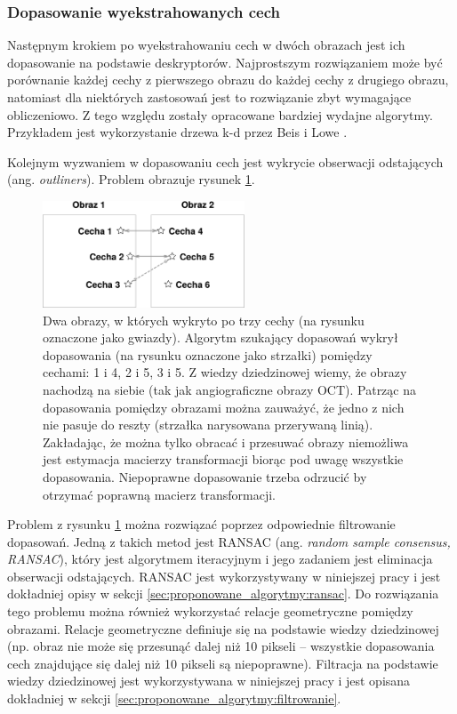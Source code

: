 \subsubsection{Dopasowanie wyekstrahowanych cech}

Następnym krokiem po wyekstrahowaniu cech w dwóch obrazach jest ich dopasowanie na podstawie deskryptorów. Najprostszym rozwiązaniem może być porównanie każdej cechy z pierwszego obrazu do każdej cechy z drugiego obrazu, natomiast dla niektórych zastosowań jest to rozwiązanie zbyt wymagające obliczeniowo. Z tego względu zostały opracowane bardziej wydajne algorytmy. Przykładem jest wykorzystanie drzewa k-d przez Beis i Lowe \cite{Beis:1997}.

Kolejnym wyzwaniem w dopasowaniu cech jest wykrycie obserwacji odstających (ang. \textit{outliners}). Problem obrazuje rysunek \ref{fig:algorytmy_korejestracji:outliners}.

\begin{figure}[H]
  \centering
  \includegraphics[width=6cm]{gfx/match}
  \caption{Dwa obrazy, w których wykryto po trzy cechy (na rysunku oznaczone jako gwiazdy). Algorytm szukający dopasowań wykrył dopasowania (na rysunku oznaczone jako strzałki) pomiędzy cechami: 1 i 4, 2 i 5, 3 i 5. Z wiedzy dziedzinowej wiemy, że obrazy nachodzą na siebie (tak jak angiograficzne obrazy OCT). Patrząc na dopasowania pomiędzy obrazami można zauważyć, że jedno z nich nie pasuje do reszty (strzałka narysowana przerywaną linią). Zakładając, że można tylko obracać i przesuwać obrazy niemożliwa jest estymacja macierzy transformacji biorąc pod uwagę wszystkie dopasowania. Niepoprawne dopasowanie trzeba odrzucić by otrzymać poprawną macierz transformacji.}
  \label{fig:algorytmy_korejestracji:outliners}
\end{figure}

Problem z rysunku \ref{fig:algorytmy_korejestracji:outliners} można rozwiązać poprzez odpowiednie filtrowanie dopasowań. Jedną z takich metod jest RANSAC (ang. \textit{random sample consensus, RANSAC}), który jest algorytmem iteracyjnym i jego zadaniem jest eliminacja obserwacji odstających. RANSAC jest wykorzystywany w niniejszej pracy i jest dokładniej opisy w sekcji \ref{sec:proponowane_algorytmy:ransac}. Do rozwiązania tego problemu można również wykorzystać relacje geometryczne pomiędzy obrazami. Relacje geometryczne definiuje się na podstawie wiedzy dziedzinowej (np. obraz nie może się przesunąć dalej niż 10 pikseli -- wszystkie dopasowania cech znajdujące się dalej niż 10 pikseli są niepoprawne). Filtracja na podstawie wiedzy dziedzinowej jest wykorzystywana w niniejszej pracy i jest opisana dokładniej w sekcji \ref{sec:proponowane_algorytmy:filtrowanie}.

